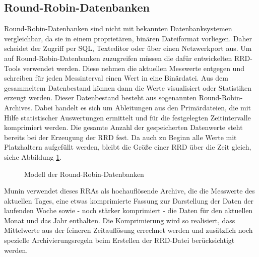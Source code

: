 \subsection{Round-Robin-Datenbanken}
Round-Robin-Datenbanken sind nicht mit bekannten Datenbanksystemen vergleichbar, da sie in einem proprietären, binären Dateiformat vorliegen.
Daher scheidet der Zugriff per SQL, Texteditor oder über einen Netzwerkport aus.
Um auf Round-Robin-Datenbanken zuzugreifen müssen die dafür entwickelten RRD-Tools verwendet werden.
Diese nehmen die aktuellen Messwerte entgegen und schreiben für jeden Messinterval einen Wert in eine Binärdatei.
Aus dem gesammeltem Datenbestand können dann die Werte visualisiert oder Statistiken erzeugt werden.
Dieser Datenbestand besteht aus sogenannten Round-Robin-Archives.
Dabei handelt es sich um Ableitungen aus den Primärdateien, die mit Hilfe statistischer Auswertungen ermittelt und für die festgelegten Zeitintervalle komprimiert werden.
Die gesamte Anzahl der gespeicherten Datenwerte steht bereits bei der Erzeugung der RRD fest.
Da auch zu Beginn alle Werte mit Platzhaltern aufgefüllt werden, bleibt die Größe einer RRD über die Zeit gleich, siehe Abbildung \ref{rrd-munin}.

\begin{figure}[ht]
	\centering
		\caption[Modell der Round-Robin-Datenbanken]{Modell der Round-Robin-Datenbanken\protect\footnotemark}
		\label{rrd-munin}
\end{figure}

Munin verwendet dieses RRAs als hochauflösende Archive, die die Messwerte des aktuellen Tages, eine etwas komprimierte Fassung zur Darstellung der Daten der laufenden Woche sowie - noch stärker komprimiert - die Daten für den aktuellen Monat und das Jahr enthalten.
Die Komprimierung wird so realisiert, dass Mittelwerte aus der feineren Zeitauflösung errechnet werden und zusätzlich noch spezielle Archivierungsregeln beim Erstellen der RRD-Datei berücksichtigt werden.

